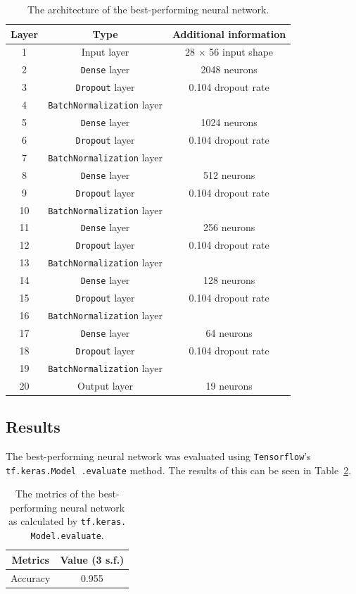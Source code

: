 \documentclass[11pt,a4paper]{article}
\begin{document}
\begin{table}[ht]
    \centering
    \begin{tabular}{c|c|c}
        Layer & Type & Additional information\\
        \hline
        1 & Input layer & 28 $\times$ 56 input shape\\
        2 & \texttt{Dense} layer & 2048 neurons \\
        3 & \texttt{Dropout} layer & 0.104 dropout rate \\
        4 & \texttt{BatchNormalization} layer \\
        5 & \texttt{Dense} layer & 1024 neurons \\
        6 & \texttt{Dropout} layer & 0.104 dropout rate\\
        7 & \texttt{BatchNormalization} layer \\
        8 & \texttt{Dense} layer & 512 neurons \\
        9 & \texttt{Dropout} layer & 0.104 dropout rate\\
        10 & \texttt{BatchNormalization} layer \\
        11 & \texttt{Dense} layer & 256 neurons \\
        12 & \texttt{Dropout} layer & 0.104 dropout rate\\
        13 & \texttt{BatchNormalization} layer \\
        14 & \texttt{Dense} layer & 128 neurons \\
        15 & \texttt{Dropout} layer & 0.104 dropout rate\\
        16 & \texttt{BatchNormalization} layer \\
        17 & \texttt{Dense} layer & 64 neurons \\
        18 & \texttt{Dropout} layer & 0.104 dropout rate\\
        19 & \texttt{BatchNormalization} layer \\
        20 & Output layer & 19 neurons\\
    \end{tabular}
    \caption{The architecture of the best-performing neural network.}\label{tab:nn_arch}
\end{table}
\newpage
\subsection{Results}
The best-performing neural network was evaluated using \texttt{Tensorflow}'s \texttt{tf.keras.Model .evaluate} method. The results of this can be seen in Table~\ref{tab:nn_eval}.
\begin{table}[ht]
    \centering
    \begin{tabular}{c|c}
        Metrics & Value (3 s.f.)\\
        \hline
        Accuracy & 0.955 \\
    \end{tabular}
    \caption{The metrics of the best-performing neural network as calculated by \texttt{tf.keras. Model.evaluate}.}\label{tab:nn_eval}
\end{table}
\end{document}
